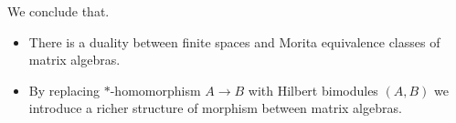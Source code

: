 \documentclass[a4paper]{article}
\theoremstyle{definition}
\theoremstyle{definition}
\theoremstyle{definition}
\theoremstyle{theorem}
\theoremstyle{theorem}
\theoremstyle{theorem}
\theoremstyle{definition}
\begin{document}
We conclude that.
\begin{itemize}
    \item There is a duality between finite spaces and Morita equivalence classes of matrix algebras.
    \item By replacing $*$-homomorphism $A\rightarrow B$ with Hilbert bimodules $(A,B)$ we introduce
        a richer structure of morphism between matrix algebras.
\end{itemize}
\end{document}
